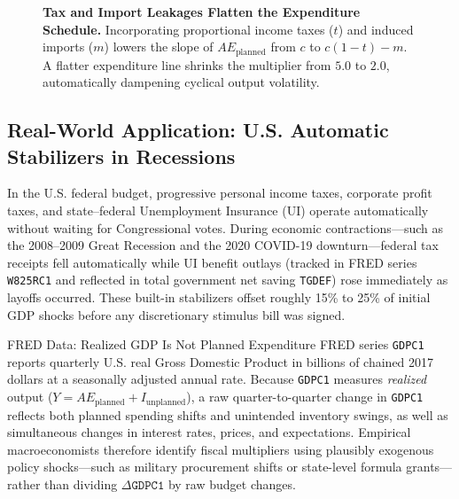 \documentclass[11pt,letterpaper]{article}
\begin{document}
\begin{figure}[h!]
\caption{\textbf{Tax and Import Leakages Flatten the Expenditure Schedule.} Incorporating proportional income taxes ($t$) and induced imports ($m$) lowers the slope of $AE_{\text{planned}}$ from $c$ to $c(1-t)-m$. A flatter expenditure line shrinks the multiplier from $5.0$ to $2.0$, automatically dampening cyclical output volatility.}
\label{fig:ch8-leakages-flatter}
\end{figure}

\subsection*{Real-World Application: U.S. Automatic Stabilizers in Recessions}
In the U.S. federal budget, progressive personal income taxes, corporate profit taxes, and state--federal Unemployment Insurance (UI) operate automatically without waiting for Congressional votes. During economic contractions—such as the 2008--2009 Great Recession and the 2020 COVID-19 downturn—federal tax receipts fell automatically while UI benefit outlays (tracked in FRED series \texttt{W825RC1} and reflected in total government net saving \texttt{TGDEF}) rose immediately as layoffs occurred. These built-in stabilizers offset roughly 15\% to 25\% of initial GDP shocks before any discretionary stimulus bill was signed.

\begin{examplecase}{FRED Data: Realized GDP Is Not Planned Expenditure}
FRED series \texttt{GDPC1} reports quarterly U.S. real Gross Domestic Product in billions of chained 2017 dollars at a seasonally adjusted annual rate. Because \texttt{GDPC1} measures \emph{realized} output ($Y = AE_{\text{planned}} + I_{\text{unplanned}}$), a raw quarter-to-quarter change in \texttt{GDPC1} reflects both planned spending shifts and unintended inventory swings, as well as simultaneous changes in interest rates, prices, and expectations. Empirical macroeconomists therefore identify fiscal multipliers using plausibly exogenous policy shocks—such as military procurement shifts or state-level formula grants—rather than dividing $\Delta\texttt{GDPC1}$ by raw budget changes.
\end{examplecase}
\end{document}
